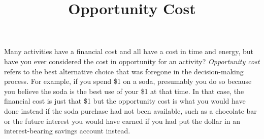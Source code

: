\documentclass{ximera}
\title{Opportunity Cost}
\begin{document}
\begin{abstract}

\end{abstract}
\maketitle

Many activities have a financial cost and all have a cost in time and energy, but have you ever considered the cost in opportunity for an activity? \emph{Opportunity cost} refers to the best alternative choice that was foregone in the decision-making process. For example, if you spend \$1 on a soda, presumably you do so because you believe the soda is the best use of your \$1 at that time. In that case, the financial cost is just that \$1 but the opportunity cost is what you would have done instead if the soda purchase had not been available, such as a chocolate bar or the future interest you would have earned if you had put the dollar in an interest-bearing savings account instead.
\end{document}
